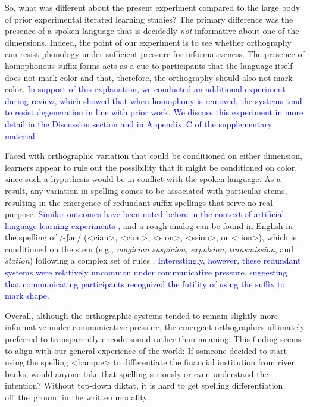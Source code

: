\documentclass[doc,biblatex]{apa7}
\newcommand\newmaterial[1]{\textcolor{blue}{#1}}
\begin{document}
So, what was different about the present experiment compared to the large body of prior experimental iterated learning studies? The primary difference was the presence of a spoken language that is decidedly \textit{not} informative about one of the dimensions. Indeed, the point of our experiment is to see whether orthography can resist phonology under sufficient pressure for informativeness. The presence of homophonous suffix forms acts as a cue to participants that the language itself does not mark color and that, therefore, the orthography should also not mark color. \newmaterial{In support of this explanation, we conducted an additional experiment during review, which showed that when homophony is removed, the systems tend to resist degeneration in line with prior work. We discuss this experiment in more detail in the Discussion section and in Appendix~C of the supplementary material.}

Faced with orthographic variation that could be conditioned on either dimension, learners appear to rule out the possibility that it might be conditioned on color, since such a hypothesis would be in conflict with the spoken language. As a result, any variation in spelling comes to be associated with particular stems, resulting in the emergence of redundant suffix spellings that serve no real purpose. \newmaterial{Similar outcomes have been noted before in the context of artificial language learning experiments \parencite{Smith:2010},} and a rough analog can be found in English in the spelling of /-ʃən/ (<cian>, <cion>, <sion>, <ssion>, or <tion>), which is conditioned on the stem (e.g., \textit{magician} \textit{suspicion}, \textit{expulsion}, \textit{transmission}, and \textit{station}) following a complex set of rules \parencite[pp.~420--421]{Carney:1994}. \newmaterial{Interestingly, however, these redundant systems were relatively uncommon under communicative pressure, suggesting that communicating participants recognized the futility of using the suffix to mark shape.}

Overall, although the orthographic systems tended to remain slightly more informative under communicative pressure, the emergent orthographies ultimately preferred to transparently encode sound rather than meaning. This finding seems to align with our general experience of the world: If someone decided to start using the spelling <banque> to differentiate the financial institution from river banks, would anyone take that spelling seriously or even understand the intention? Without top-down diktat, it is hard to get spelling differentiation off~the~ground in the written modality.
\end{document}
